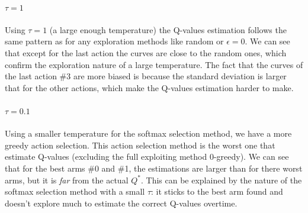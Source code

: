 \documentclass[letterpaper]{article}
\begin{document}
\paragraph{$\tau = 1$} Using $\tau = 1$ (a large enough temperature)
the Q-values estimation follows the same pattern as for any exploration methods
like random or $\epsilon = 0$. We can see that except for the last action
the curves are close to the random ones,
which confirm the exploration nature of a large temperature.
The fact that the curves of
the last action \#3 are more biased is because the standard deviation
is larger that for the other actions, which make the Q-values estimation
harder to make.


\paragraph{$\tau = 0.1$} Using a smaller temperature for the softmax
selection method, we have a more greedy action selection.
This action selection method is the worst one that estimate Q-values
(excluding the full exploiting method 0-greedy). We can see that
for the best arms \#0 and \#1, the estimations are larger than for there
worst arms, but it is \textit{far} from the actual $Q^*$. This can be explained
by the nature of the softmax selection method with a
small $\tau$: it sticks to the best arm
found and doesn't explore much to estimate the correct Q-values overtime.
\end{document}
